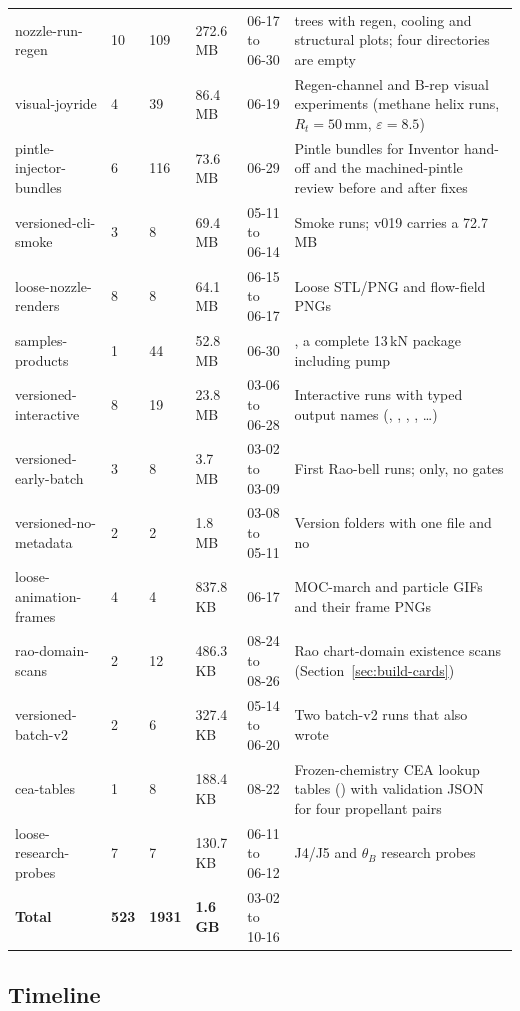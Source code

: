 {\begin{longtable}{P{3.25cm}N{1.0cm}N{0.8cm}N{1.35cm}P{2.05cm}P{6.35cm}}
nozzle-run-regen & 10 & 109 & 272.6 MB & 06-17 to 06-30 &  trees with regen, cooling and structural plots; four directories are empty\\
visual-joyride & 4 & 39 & 86.4 MB & 06-19 & Regen-channel and B-rep visual experiments (methane helix runs, $R_t = 50$\,mm, $\varepsilon = 8.5$)\\
pintle-injector-bundles & 6 & 116 & 73.6 MB & 06-29 & Pintle bundles for Inventor hand-off and the machined-pintle review before and after fixes\\
versioned-cli-smoke & 3 & 8 & 69.4 MB & 05-11 to 06-14 & Smoke runs; v019 carries a 72.7\,MB \\
loose-nozzle-renders & 8 & 8 & 64.1 MB & 06-15 to 06-17 & Loose  STL/PNG and flow-field PNGs\\
samples-products & 1 & 44 & 52.8 MB & 06-30 & , a complete 13\,kN package including pump\\
versioned-interactive & 8 & 19 & 23.8 MB & 03-06 to 06-28 & Interactive runs with typed output names (, , , , \dots)\\
versioned-early-batch & 3 & 8 & 3.7 MB & 03-02 to 03-09 & First Rao-bell runs;  only, no gates\\
versioned-no-metadata & 2 & 2 & 1.8 MB & 03-08 to 05-11 & Version folders with one file and no \\
loose-animation-frames & 4 & 4 & 837.8 KB & 06-17 & MOC-march and particle GIFs and their frame PNGs\\
rao-domain-scans & 2 & 12 & 486.3 KB & 08-24 to 08-26 & Rao chart-domain existence scans (Section~\ref{sec:build-cards})\\
versioned-batch-v2 & 2 & 6 & 327.4 KB & 05-14 to 06-20 & Two batch-v2 runs that also wrote \\
cea-tables & 1 & 8 & 188.4 KB & 08-22 & Frozen-chemistry CEA lookup tables () with validation JSON for four propellant pairs\\
loose-research-probes & 7 & 7 & 130.7 KB & 06-11 to 06-12 & J4/J5 and $\theta_B$ research probes\\
\midrule
\textbf{Total} & \textbf{523} & \textbf{1931} & \textbf{1.6 GB} & 03-02 to 10-16 & \\
\end{longtable}
}

\subsection{Timeline}\label{sec:builds-archive-timeline}

